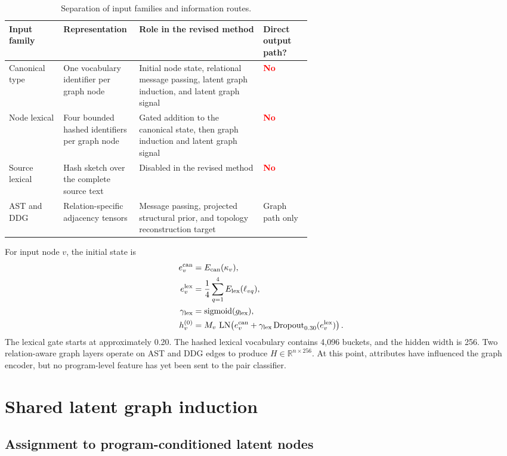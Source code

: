 \documentclass[11pt,a4paper]{article}
\newcommand{\R}{\mathbb{R}}
\newcommand{\sigmoid}{\operatorname{sigmoid}}
\newcommand{\LN}{\operatorname{LN}}
\newcommand{\no}{\textcolor{red}{\textbf{No}}}
\begin{document}
\begin{table}[H]
\centering
\small
\begin{tabularx}{\linewidth}{p{0.18\linewidth}p{0.25\linewidth}Xp{0.16\linewidth}}
\toprule
Input family & Representation & Role in the revised method & Direct output path? \\
\midrule
Canonical type & One vocabulary identifier per graph node & Initial node state, relational message passing, latent graph induction, and latent graph signal & \no \\
Node lexical & Four bounded hashed identifiers per graph node & Gated addition to the canonical state, then graph induction and latent graph signal & \no \\
Source lexical & Hash sketch over the complete source text & Disabled in the revised method & \no \\
AST and DDG & Relation-specific adjacency tensors & Message passing, projected structural prior, and topology reconstruction target & Graph path only \\
\bottomrule
\end{tabularx}
\caption{Separation of input families and information routes.}
\end{table}

For input node $v$, the initial state is
\begin{align}
e_v^{\rm can}&=E_{\rm can}(\kappa_v),\\
e_v^{\rm lex}&=\frac{1}{4}\sum_{q=1}^{4}E_{\rm lex}(\ell_{vq}),\\
\gamma_{\rm lex}&=\sigmoid(g_{\rm lex}),\\
h_v^{(0)}&=M_v\,\LN\!\left(
e_v^{\rm can}+\gamma_{\rm lex}
\operatorname{Dropout}_{0.30}(e_v^{\rm lex})\right).
\end{align}
The lexical gate starts at approximately 0.20. The hashed lexical vocabulary
contains 4,096 buckets, and the hidden width is 256. Two relation-aware graph
layers operate on AST and DDG edges to produce
$H\in\R^{n\times256}$. At this point, attributes have influenced the graph
encoder, but no program-level feature has yet been sent to the pair classifier.

\section{Shared latent graph induction}

\subsection{Assignment to program-conditioned latent nodes}
\end{document}

